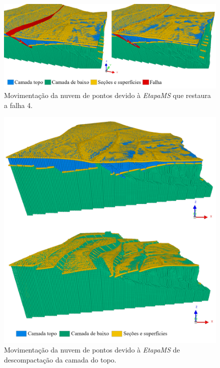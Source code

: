 \begin{figure} [H]
  \begin{center}
    \includegraphics[width=\textwidth]{images/fig-vol-ex-6}
    \caption{Movimentação da nuvem de pontos devido à \emph{EtapaMS} que restaura a falha 4.}\label{fig-vol-ex-6}
  \end{center}
\end{figure}

\begin{figure} [H]
  \begin{center}
    \includegraphics[width=350pt]{images/fig-vol-ex-7}
    \caption{Movimentação da nuvem de pontos devido à \emph{EtapaMS} de descompactação da camada do topo.}\label{fig-vol-ex-7}
  \end{center}
\end{figure}

